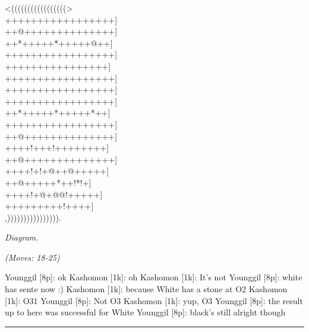 \documentclass[letterpaper,12pt]{memoir}
\newcounter{GoFigure}[part]
\newcommand{\gofigure}{%
 \stepcounter{GoFigure}
 \centerline{\textit{Diagram.\thinspace\arabic{GoFigure}}}
}
\newcommand{\subtext}[1]{\centerline{\textit{#1}}}
\begin{document}
\begin{minipage}[t]{240pt}
{\gnos
<(((((((((((((((((>\\
+++++++++++++++++]\\
++@++++++++++++++]\\
++*+++++*+++++@++]\\
+++++++++++++++++]\\
++++++++++++++++]\\
+++++++++++++++++]\\
+++++++++++++++++]\\
+++++++++++++++++]\\
++*+++++*+++++*++]\\
+++++++++++++++++]\\
++@++++++++++++++]\\
++++!+++!++++++++]\\
++@++++++++++++++]\\
++++!+!+@++@+++++]\\
++@+++++*++!*!+]\\
++++!+@+@@!+++++]\\
+++++++++!++++]\\
,)))))))))))))))).\\
}
\gofigure

\subtext{(Moves: 18-25)}
\end{minipage}
\begin{minipage}[t]{268.19999999999993pt}
\setlength{\parskip}{0.5em}
Younggil [8p]: ok
Kashomon [1k]: oh
Kashomon [1k]: It's not
Younggil [8p]: white has sente now :)
Kashomon [1k]: because White has a stone at O2
Kashomon [1k]: O31
Younggil [8p]: Not O3
Kashomon [1k]: yup, O3
Younggil [8p]: the result up to here was successful for White
Younggil [8p]: black's still alright though


\end{minipage}
\vfill

\rule{\textwidth}{0.5pt}
\end{document}
